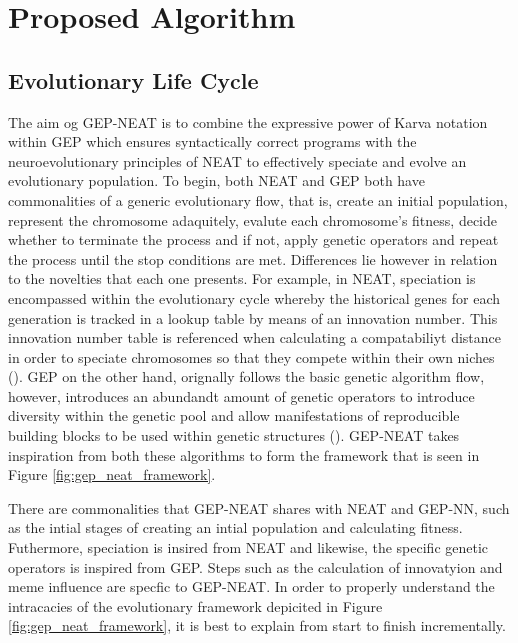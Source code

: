 \section{Proposed Algorithm}\label{sec:gep_neat_proposed_algorithm}
\subsection{Evolutionary Life Cycle}
The aim og GEP-NEAT is to combine the expressive power of Karva notation within GEP which ensures syntactically correct programs with the neuroevolutionary principles of NEAT to effectively speciate and evolve an evolutionary population. To begin, both NEAT and GEP both have commonalities of a generic evolutionary flow, that is, create an initial population, represent the chromosome adaquitely, evalute each chromosome's fitness, decide whether to terminate the process and if not, apply genetic operators and repeat the process until the stop conditions are met. Differences lie however in relation to the novelties that each one presents. For example, in NEAT, speciation is encompassed within the evolutionary cycle whereby the historical genes for each generation is tracked in a lookup table by means of an innovation number. This innovation number table is referenced when calculating a compatabiliyt distance in order to speciate chromosomes so that they compete within their own niches (\cite{stanley2002evolving}). GEP on the other hand, orignally follows the basic genetic algorithm flow, however, introduces an abundandt amount of genetic operators to introduce diversity within the genetic pool and allow manifestations of reproducible building blocks to be used within genetic structures (\cite{ferreira2006gene}). GEP-NEAT takes inspiration from both these algorithms to form the framework that is seen in Figure \ref{fig:gep_neat_framework}. \bigskip

\noindent There are commonalities that GEP-NEAT shares with NEAT and GEP-NN, such as the intial stages of creating an intial population and calculating fitness. Futhermore, speciation is insired from NEAT and likewise, the specific genetic operators is inspired from GEP. Steps such as the calculation of innovatyion and meme influence are specfic to GEP-NEAT. In order to properly understand the intracacies of the evolutionary framework depicited in Figure \ref{fig:gep_neat_framework}, it is best to explain from start to finish incrementally.

